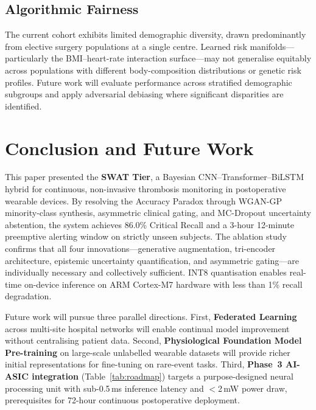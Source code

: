 \documentclass[conference]{IEEEtran}
\begin{document}
\subsection{Algorithmic Fairness}
The current cohort exhibits limited demographic diversity, drawn
predominantly from elective surgery populations at a single centre.
Learned risk manifolds---particularly the BMI--heart-rate interaction
surface---may not generalise equitably across populations with
different body-composition distributions or genetic risk profiles.
Future work will evaluate performance across stratified demographic
subgroups and apply adversarial debiasing where significant disparities
are identified.

\section{Conclusion and Future Work}

This paper presented the \textbf{SWAT Tier}, a Bayesian
CNN--Transformer--BiLSTM hybrid for continuous, non-invasive
thrombosis monitoring in postoperative wearable devices.  By resolving
the Accuracy Paradox through WGAN-GP minority-class synthesis,
asymmetric clinical gating, and MC-Dropout uncertainty abstention, the
system achieves 86.0\% Critical Recall and a 3-hour 12-minute
preemptive alerting window on strictly unseen subjects.  The ablation
study confirms that all four innovations---generative augmentation,
tri-encoder architecture, epistemic uncertainty quantification, and
asymmetric gating---are individually necessary and collectively
sufficient.  INT8 quantisation enables real-time on-device inference on
ARM Cortex-M7 hardware with less than 1\% recall degradation.

Future work will pursue three parallel directions.  First,
\textbf{Federated Learning} across multi-site hospital networks will
enable continual model improvement without centralising patient data.
Second, \textbf{Physiological Foundation Model Pre-training} on
large-scale unlabelled wearable datasets will provide richer initial
representations for fine-tuning on rare-event tasks.  Third,
\textbf{Phase~3 AI-ASIC integration} (Table~\ref{tab:roadmap}) targets
a purpose-designed neural processing unit with sub-0.5\,ms inference
latency and $<$2\,mW power draw, prerequisites for 72-hour continuous
postoperative deployment.
\end{document}
